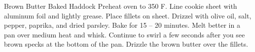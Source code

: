 \documentclass[../main.tex]{subfiles}
\begin{document}
\begin{recipe}{Brown Butter Baked Haddock}{}{}
    Preheat oven to 350\degrees{} F. Line cookie sheet with aluminum foil and
    lightly grease. Place fillets on sheet.
    Drizzel with olive oil, salt, pepper, paprika, and dried parsley. Bake
    for 15 -- 20 minutes.
    Melt better in a pan over medium heat and whisk. Continue to swirl a few
    seconds after you see brown specks at the bottom of the pan. Drizzle the
    brown butter over the fillets.
\end{recipe}
\end{document}
